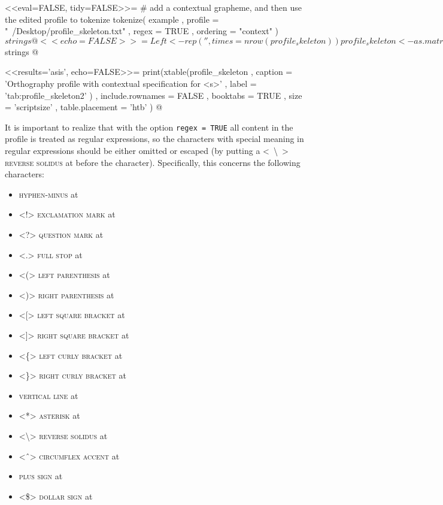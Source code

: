 <<eval=FALSE, tidy=FALSE>>=
# add a contextual grapheme, and then use the edited profile to tokenize
tokenize( example
         , profile = "~/Desktop/profile_skeleton.txt"
         , regex = TRUE
         , ordering = "context"
        )$strings
@

<<echo=FALSE>>=
Left <- rep('', times = nrow(profile_skeleton))
profile_skeleton <- as.matrix(cbind(Left, profile_skeleton))
profile_skeleton <- rbind(c('mi','s','','',''), profile_skeleton)
tokenize(example, profile = profile_skeleton, regex = TRUE, order='context')$strings
@

<<results='asis', echo=FALSE>>=
print(xtable(profile_skeleton
        , caption = 'Orthography profile with contextual specification for <s>'
        , label = 'tab:profile_skeleton2'
        )
  , include.rownames = FALSE
  , booktabs = TRUE
  , size = 'scriptsize'
  , table.placement = 'htb'
  )
@

It is important to realize that with the option \texttt{regex = TRUE} all
content in the profile is treated as regular expressions, so the characters with
special meaning in regular expressions should be either omitted or escaped (by
putting a <\ \backslash\ > \textsc{reverse solidus} at  before the
character). Specifically, this concerns the following characters:

\begin{itemize}
  
  \item[] <-> \textsc{hyphen-minus} at 
  \item[] <!> \textsc{exclamation mark} at 
  \item[] <?> \textsc{question mark} at 
  \item[] <.> \textsc{full stop} at 
  \item[] <(> \textsc{left parenthesis} at 
  \item[] <)> \textsc{right parenthesis} at 
  \item[] <[> \textsc{left square bracket} at 
  \item[] <]> \textsc{right square bracket} at 
  \item[] <\{> \textsc{left curly bracket} at 
  \item[] <\}> \textsc{right curly bracket} at 
  \item[] <|> \textsc{vertical line} at 
  \item[] <*> \textsc{asterisk} at 
  \item[] <\backslash> \textsc{reverse solidus} at 
  \item[] <ˆ> \textsc{circumflex accent} at 
  \item[] <+> \textsc{plus sign} at 
  \item[] <\$> \textsc{dollar sign} at 
  
\end{itemize}

